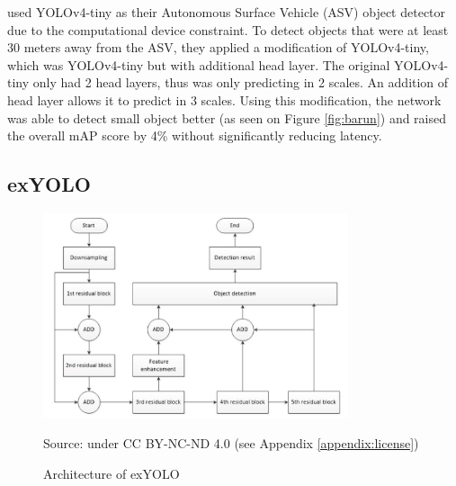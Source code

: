  \textcite{barunastra} used YOLOv4-tiny as their Autonomous Surface Vehicle (ASV) object detector due to the computational
  device constraint.
  To detect objects that were at least 30 meters away from the ASV, they applied a modification of YOLOv4-tiny, which was YOLOv4-tiny
  but with additional head layer. The original YOLOv4-tiny only had 2 head layers, thus was only predicting in 2 scales.
  An addition of head layer allows it to predict in 3 scales. Using this modification, the network was able to detect small object
  better (as seen on Figure \ref{fig:barun}) and raised the overall mAP score by 4\% without significantly reducing latency.




  \subsection{exYOLO}
  \begin{figure}[p]
    \centering
    \includegraphics[width=0.8\textwidth]{figures/exyolo.png}
    \caption*{Source: \textcite{exyolo} under CC BY-NC-ND 4.0 (see Appendix \ref{appendix:license})}
    \vspace{-1ex}
    \caption{Architecture of exYOLO}
    \label{fig:exyolo}
  \end{figure}

